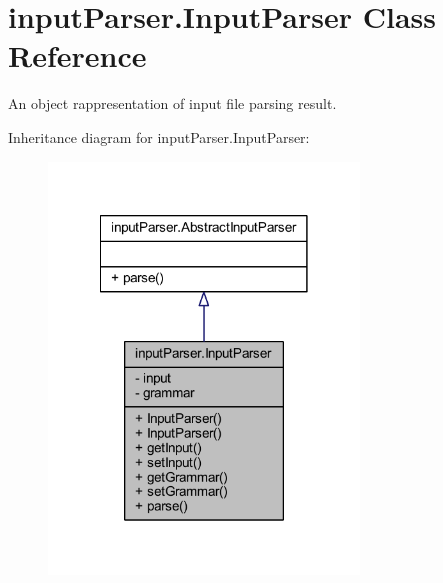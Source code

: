 \hypertarget{classinput_parser_1_1_input_parser}{\section{input\-Parser.\-Input\-Parser Class Reference}
\label{classinput_parser_1_1_input_parser}
}


An object rappresentation of input file parsing result.  




Inheritance diagram for input\-Parser.\-Input\-Parser\-:\nopagebreak
\begin{figure}[H]
\begin{center}
\leavevmode
\includegraphics[width=234pt]{classinput_parser_1_1_input_parser__inherit__graph}
\end{center}
\end{figure}



